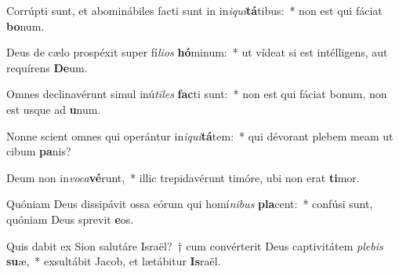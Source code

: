 \item Corrúpti sunt, et abominábiles facti sunt in in\textit{i}\textit{qui}\textbf{tá}tibus:~* non est qui fáciat \textbf{bo}num.
\item Deus de cælo prospéxit super fí\textit{li}\textit{os} \textbf{hó}minum:~* ut vídeat si est intélligens, aut requírens \textbf{De}um.
\item Omnes declinavérunt simul inú\textit{ti}\textit{les} \textbf{fac}ti sunt:~* non est qui fáciat bonum, non est usque ad \textbf{u}num.
\item Nonne scient omnes qui operántur in\textit{i}\textit{qui}\textbf{tá}tem:~* qui dévorant plebem meam ut cibum \textbf{pa}nis?
\item Deum non in\textit{vo}\textit{ca}\textbf{vé}runt,~* illic trepidavérunt timóre, ubi non erat \textbf{ti}mor.
\item Quóniam Deus dissipávit ossa eórum qui homí\textit{ni}\textit{bus} \textbf{pla}cent:~* confúsi sunt, quóniam Deus sprevit \textbf{e}os.
\item Quis dabit ex Sion salutáre Israël?~† cum convérterit Deus captivitátem \textit{ple}\textit{bis} \textbf{su}æ,~* exsultábit Jacob, et lætábitur \textbf{Is}raël.

